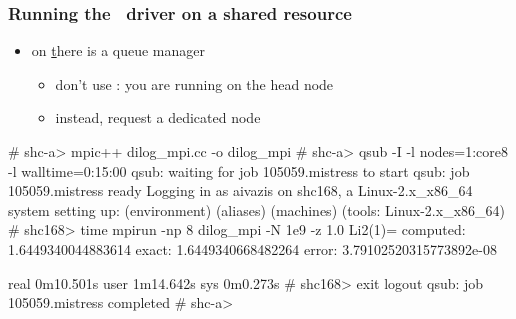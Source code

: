 
\begin{frame}[fragile]
%
  \frametitle{Running the \mpi\ driver on a shared resource}
%
  \begin{itemize}
  \item on \href{shc.cacr.caltech.edu} there is a queue manager
    \begin{itemize}
    \item don't use : you are running on the head node
    \item instead, request a dedicated node
    \end{itemize}
  \end{itemize}
%
  \begin{shell}{}
# shc-a> mpic++ dilog_mpi.cc -o dilog_mpi
# shc-a> qsub -I -l nodes=1:core8 -l walltime=0:15:00
qsub: waiting for job 105059.mistress to start
qsub: job 105059.mistress ready
Logging in as aivazis on shc168, a Linux-2.x_x86_64 system
  setting up: (environment) (aliases) (machines) (tools: Linux-2.x_x86_64)
# shc168> time mpirun -np 8 dilog_mpi -N 1e9 -z 1.0
Li2(1)=
 computed: 1.6449340044883614
    exact: 1.6449340668482264
    error: 3.79102520315773892e-08

real    0m10.501s
user    1m14.642s
sys     0m0.273s
# shc168> exit
logout
qsub: job 105059.mistress completed
# shc-a>
  \end{shell}
%
\end{frame}

